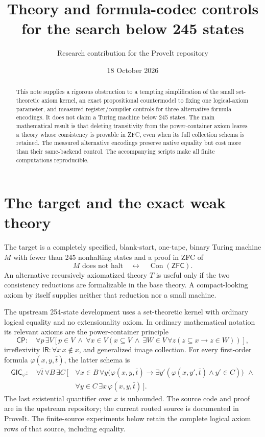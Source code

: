 \documentclass[11pt]{article}
\title{Theory and formula-codec controls for the search below 245 states}
\author{Research contribution for the ProveIt repository}
\date{18 October 2026}
\newcommand{\ZFC}{\mathsf{ZFC}}
\newcommand{\CP}{\mathsf{CP}}
\newcommand{\GIC}{\mathsf{GIC}}
\newcommand{\IR}{\mathsf{IR}}
\newcommand{\Con}{\operatorname{Con}}
\begin{document}
\maketitle
\begin{abstract}
This note supplies a rigorous obstruction to a tempting simplification of the
small set-theoretic axiom kernel, an exact propositional countermodel to fixing
one logical-axiom parameter, and measured register/compiler controls for three
alternative formula encodings.  It does not claim a Turing machine below 245
states.  The main mathematical result is that deleting transitivity from the
power-container axiom leaves a theory whose consistency is provable in ZFC,
even when its full collection schema is retained.  The measured alternative
encodings preserve native equality but cost more than their same-backend
control.  The accompanying scripts make all finite computations reproducible.
\end{abstract}

\section{The target and the exact weak theory}

The target is a completely specified, blank-start, one-tape, binary Turing
machine $M$ with fewer than 245 nonhalting states and a proof in ZFC of
\[
 M\text{ does not halt}\quad\longleftrightarrow\quad\Con(\ZFC).
\]
An alternative recursively axiomatized theory $T$ is useful only if the two
consistency reductions are formalizable in the base theory.  A compact-looking
axiom by itself supplies neither that reduction nor a small machine.

The upstream 254-state development uses a set-theoretic kernel with ordinary
logical equality and no extensionality axiom.  In ordinary mathematical
notation its relevant axioms are the power-container principle
\begin{equation}\label{eq:cp}
 \CP:\quad\forall p\,\exists V\left[
 p\in V\ \land\ \forall x\in V\left(
 x\subseteq V\ \land\ \exists W\in V\,\forall z
       (z\subseteq x\longrightarrow z\in W)\right)\right],
\end{equation}
irreflexivity $\IR:\forall x\,x\notin x$, and generalized image collection.
For every first-order formula $\varphi(x,y,\bar t)$, the latter schema is
\begin{equation}\label{eq:gic}
\begin{split}
\GIC_\varphi:\quad\forall\bar t\,\forall B\,\exists C\,[\,&
\forall x\in B\,\forall y\bigl(\varphi(x,y,\bar t)\longrightarrow
  \exists y'(\varphi(x,y',\bar t)\land y'\in C)\bigr)\ \,\land\\
&\forall y\in C\,\exists x\,\varphi(x,y,\bar t)\,].
\end{split}
\end{equation}
The last existential quantifier over $x$ is unbounded.  The source code and
proof are in the upstream repository\cite{jeff}; the current routed source is
documented in ProveIt\cite{proveit}.  The finite-source experiments below retain
the complete logical axiom rows of that source, including equality.
\end{document}
